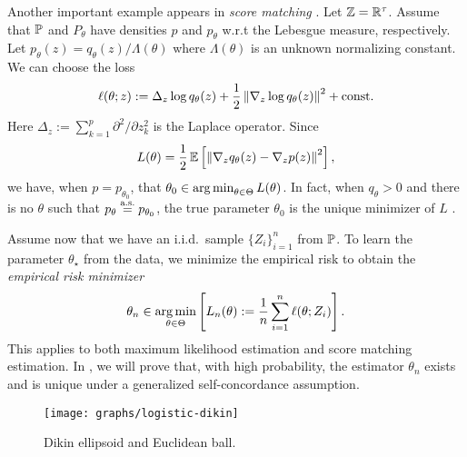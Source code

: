 \begin{example}
    Another important example appears in \emph{score matching} \citep{hyvarinen2005estimation}.
    Let $\mathbb{Z} = {\mathbb R}^\tau$.
    Assume that $\operatorname{\mathbb P}$ and $P_\theta$ have densities $p$ and $p_\theta$ w.r.t the Lebesgue measure, respectively.
    Let $p_\theta(z) = q_\theta(z) / \Lambda(\theta)$ where $\Lambda(\theta)$ is an unknown normalizing constant. We can choose the loss
    \begin{align*}
        \ell(\theta; z) := \Delta_z \log{q_\theta(z)} + \frac12 \left\lVert \nabla_z \log{q_\theta(z)} \right\rVert^2 + \text{const}.
    \end{align*}
    Here $\Delta_z := \sum_{k=1}^p \partial^2/\partial z_k^2$ is the Laplace operator.
    Since \cite[Thm.~1]{hyvarinen2005estimation}
    \begin{align*}
        L(\theta) = \frac12 \operatorname{\mathbb E}\left[ \left\lVert \nabla_z q_\theta(z) - \nabla_z p(z) \right\rVert^2 \right],
    \end{align*}
    we have, when $p = p_{\theta_0}$, that $\theta_0 \in \operatorname*{arg\,min}_{\theta \in \Theta} L(\theta)$.
    In fact, when $q_\theta > 0$ and there is no $\theta$ such that $p_\theta \overset{\mbox{\scriptsize a.s.}}{=} p_{\theta_0}$, the true parameter $\theta_0$ is the unique minimizer of $L$ \cite[Thm.~2]{hyvarinen2005estimation}.
\end{example}

Assume now that we have an i.i.d.~sample $\{Z_i\}_{i=1}^n$ from $\operatorname{\mathbb P}$.
To learn the parameter $\theta_\star$ from the data, we minimize the empirical risk to obtain the \emph{empirical risk minimizer}
\begin{align*}
    \theta_n \in \operatorname*{arg\,min}_{\theta \in \Theta} \left[ L_n(\theta) := \frac1n \sum_{i=1}^n \ell(\theta; Z_i) \right].
\end{align*}
This applies to both maximum likelihood estimation and score matching estimation. 
In , we will prove that, with high probability, the estimator $\theta_n$ exists and is unique under a generalized self-concordance assumption.

\begin{figure}
    \centering
    \texttt{[image: graphs/logistic-dikin]} %
    \caption{Dikin ellipsoid and Euclidean ball.}
    \label{fig:logistic_dikin}
\end{figure}

